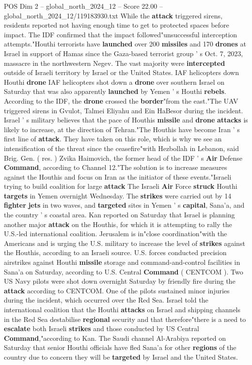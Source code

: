 \begin{textsample}{POS Dim 2 – global\_north\_2024\_12 – Score 22.00 – global\_north\_2024\_12/119183930.txt}
While the \textbf{attack} triggered sirens, residents reported not having enough time to get to protected spaces before impact.
The IDF confirmed that the impact followed"unsuccessful interception attempts."Houthi terrorists have \textbf{launched} over 200 \textbf{missiles} and 170 \textbf{drones} at Israel in support of Hamas since the Gaza-based terrorist group ' s Oct. 7, 2023, massacre in the northwestern Negev.
The vast majority were \textbf{intercepted} outside of Israeli territory by Israel or the United States.
IAF helicopters down Houthi \textbf{drone} IAF helicopters shot down a \textbf{drone} over southern Israel on Saturday that was also apparently \textbf{launched} by Yemen ' s Houthi \textbf{rebels}.
According to the IDF, the \textbf{drone} crossed the \textbf{border}"from the east."The UAV triggered sirens in Gvulot, Talmei Eliyahu and Ein HaBesor during the incident.
Israel ' s military believes that the pace of Houthis \textbf{missile} and \textbf{drone} \textbf{attacks} is likely to increase, at the direction of Tehran."The Houthis have become Iran ' s first line of \textbf{attack}.
They have taken on this role, which is why we see an intensification of the threat since the ceasefire"with Hezbollah in Lebanon, said Brig.
Gen. ( res. ) Zvika Haimovich, the former head of the IDF ' s \textbf{Air} Defense \textbf{Command}, according to Channel 12."The solution is to increase measures against the Houthis and focus on Iran as the initiator of these events."Israeli trying to build coalition for large \textbf{attack} The Israeli \textbf{Air} Force \textbf{struck} Houthi \textbf{targets} in Yemen overnight Wednesday.
The \textbf{strikes} were carried out by 14 \textbf{fighter} \textbf{jets} in two waves, and \textbf{targeted} sites in Yemen ' s \textbf{capital}, Sana'a, and the country ' s coastal area.
Kan reported on Saturday that Israel is planning another major \textbf{attack} on the Houthis, for which it is attempting to rally the U.S.-led international coalition.
Jerusalem is in"close coordination"with the Americans and is urging the U.S. military to increase the level of \textbf{strikes} against the Houthis, according to an Israeli source.
U.S. forces conducted precision airstrikes against Houthi \textbf{missile} storage and command-and-control facilities in Sana'a on Saturday, according to U.S.
Central \textbf{Command} ( CENTCOM ).
Two US Navy pilots were shot down overnight Saturday by friendly fire during the \textbf{attack} according to CENTCOM.
One of the pilots sustained minor injuries during the incident, which occurred over the Red Sea.
Israel told the international coalition that the Houthi \textbf{attacks} on Israel and shipping channels in the Red Sea destabilise \textbf{regional} security and that therefore"there is a need to \textbf{escalate} both Israeli \textbf{strikes} and those conducted by US Central \textbf{Command},"according to Kan.
The Saudi channel Al-Arabiya reported on Saturday that senior Houthi officials have fled Sana'a for other \textbf{regions} of the country due to concern they will be \textbf{targeted} by Israel and the United States.


\end{textsample}
